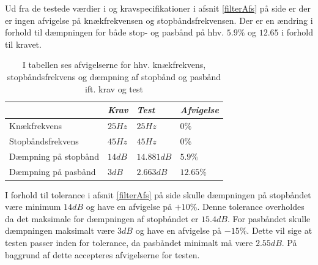 Ud fra de testede værdier i  og kravspecifikationer i afsnit \ref{filterAfs} på side \pageref{filterAfs} er der er ingen afvigelse på knækfrekvensen og stopbåndsfrekvensen. Der er en ændring i forhold til dæmpningen for både stop- og pasbånd på hhv. $5.9\%$ og $12.65$ i forhold til kravet.

\begin{table}[H]
	\centering
	\begin{tabular}{|l|l|l|l|}
		\hline
   & \textit{Krav} 	& \textit{Test}  &\textit{Afvigelse} \\ \hline
Knækfrekvens	 & $25Hz$ 			& $25Hz$			& $0\%$  \\ \hline
Stopbåndsfrekvens & $45Hz$		& $45Hz$			& $0\%$ \\ \hline
Dæmpning på stopbånd & $14dB$    & $14.881dB$    & $5.9\%$  \\ \hline
Dæmpning på pasbånd & $3dB$		& $2.663dB$	    & $12.65\%$ \\ \hline
	\end{tabular}
	\caption{I tabellen ses afvigelserne for hhv. knækfrekvens, stopbåndsfrekvens og dæmpning af stopbånd og pasbånd ift. krav og test}
	\label{Tab:Tolerance}
\end{table}

I forhold til tolerance i afsnit \ref{filterAfs} på side \pageref{filterAfs} skulle dæmpningen på stopbåndet være minimum $14 dB$ og have en afvigelse på $+10\%$. Denne tolerance overholdes da det maksimale for dæmpningen af stopbåndet er $15.4dB$. For pasbåndet skulle dæmpningen maksimalt være $3dB$ og have en afvigelse på $-15\%$. Dette vil sige at testen passer inden for tolerance, da pasbåndet minimalt må være $2.55dB$. På baggrund af dette accepteres afvigelserne for testen.